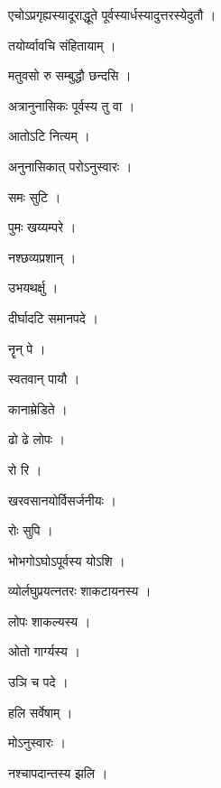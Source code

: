 \documentclass[10pt, openany]{book}
\begin{document}
\noindent एचोऽप्रगृह्यस्यादूराद्धूते पूर्वस्यार्धस्यादुत्तरस्येदुतौ ।

\noindent तयोर्य्वावचि संहितायाम् ।

\noindent मतुवसो रु सम्बुद्धौ छन्दसि ।

\noindent अत्रानुनासिकः पूर्वस्य तु वा ।

\noindent आतोऽटि नित्यम् ।

\noindent अनुनासिकात् परोऽनुस्वारः ।

\noindent समः सुटि ।

\noindent पुमः खय्यम्परे ।

\noindent नश्छव्यप्रशान् ।

\noindent उभयथर्क्षु ।

\noindent दीर्घादटि समानपदे ।

\noindent नॄन् पे ।

\noindent स्वतवान् पायौ ।

\noindent कानाम्रेडिते ।

\noindent ढो ढे लोपः ।

\noindent रो रि ।

\noindent खरवसानयोर्विसर्जनीयः ।

\noindent रोः सुपि ।

\noindent भोभगोऽघोऽपूर्वस्य योऽशि ।

\noindent व्योर्लघुप्रयत्नतरः शाकटायनस्य ।

\noindent लोपः शाकल्यस्य ।

\noindent ओतो गार्ग्यस्य ।

\noindent उञि च पदे ।

\noindent हलि सर्वेषाम् ।

\noindent मोऽनुस्वारः ।

\noindent नश्चापदान्तस्य झलि ।
\end{document}
